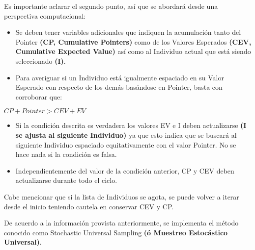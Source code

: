 \documentclass[letterpaper,10pt,english]{sphinxmanual}
\begin{document}
\begin{DUlineblock}{0em}
\item[] Es importante aclarar el segundo punto, así que se abordará desde una perspectiva computacional:
\end{DUlineblock}
\begin{itemize}
\item {} 
Se deben tener variables adicionales que indiquen la acumulación tanto del Pointer \textbf{(CP, Cumulative Pointers)} como de los Valores Esperados \textbf{(CEV, Cumulative Expected Value)} así como al Individuo actual que está siendo seleccionado \textbf{(I)}.

\item {} 
Para averiguar si un Individuo está igualmente espaciado en su Valor Esperado con respecto de los demás basándose en Pointer, basta con corroborar que:

\end{itemize}

\begin{center}\(CP + Pointer > CEV + EV\)
\end{center}\begin{itemize}
\item {} 
Si la condición descrita es verdadera los valores EV e I deben actualizarse \textbf{(I se ajusta al siguiente Individuo)} ya que esto indica que se buscará al siguiente Individuo espaciado equitativamente con el valor Pointer. No se hace nada si la condición es falsa.

\item {} 
Independientemente del valor de la condición anterior, CP y CEV deben actualizarse durante todo el ciclo.

\end{itemize}

\begin{DUlineblock}{0em}
\item[] Cabe mencionar que si la lista de Individuos se agota, se puede volver a iterar
desde el inicio teniendo cautela en conservar CEV y CP.
\end{DUlineblock}
\label{Model/Operator/Selection/StochasticUniversalSampling:module-Model.Operator.Selection.StochasticUniversalSampling}

\begin{fulllineitems}
\label{Model/Operator/Selection/StochasticUniversalSampling:Model.Operator.Selection.StochasticUniversalSampling.execute_selection_technique}
De acuerdo a la información provista anteriormente, se implementa
el método conocido como Stochastic Universal Sampling \textbf{(ó Muestreo Estocástico Universal)}.

\end{fulllineitems}
\end{document}
